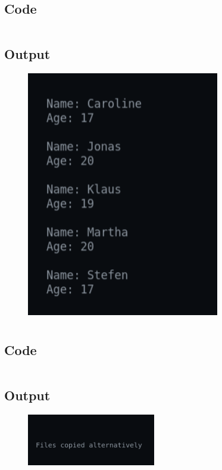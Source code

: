 \documentclass[12pt]{article}
\begin{document}
\section{}
\subsection{Code}
\inputminted{c}{q9.c}
\newpage
\subsection{Output}
\begin{figure}[h]
    \centering
    \includegraphics[width=0.75\textwidth]{9.png}
\end{figure}
\newpage
\section{}
\subsection{Code}
\inputminted{c}{q10.c}
\newpage
\subsection{Output}
\begin{figure}[h]
    \centering
    \includegraphics[width=0.5\textwidth]{10.png}
\end{figure}
\end{document}
